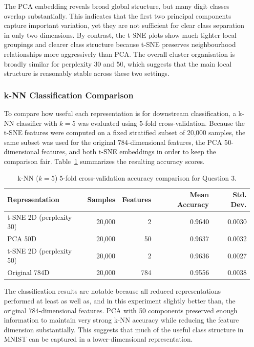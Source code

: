 \documentclass[11pt]{article}
\begin{document}
The PCA embedding reveals broad global structure, but many digit classes overlap substantially. This indicates that the first two principal components capture important variation, yet they are not sufficient for clear class separation in only two dimensions. By contrast, the t-SNE plots show much tighter local groupings and clearer class structure because t-SNE preserves neighbourhood relationships more aggressively than PCA. The overall cluster organisation is broadly similar for perplexity 30 and 50, which suggests that the main local structure is reasonably stable across these two settings.

\subsubsection{k-NN Classification Comparison}

To compare how useful each representation is for downstream classification, a k-NN classifier with \(k=5\) was evaluated using 5-fold cross-validation. Because the t-SNE features were computed on a fixed stratified subset of 20,000 samples, the same subset was used for the original 784-dimensional features, the PCA 50-dimensional features, and both t-SNE embeddings in order to keep the comparison fair. Table~\ref{tab:q3-knn-comparison} summarizes the resulting accuracy scores.

\begin{table}[ht]
    \centering
    \caption{k-NN (\(k=5\)) 5-fold cross-validation accuracy comparison for Question 3.}
    \label{tab:q3-knn-comparison}
    \begin{tabular}{lrrrr}
        \toprule
        Representation & Samples & Features & Mean Accuracy & Std. Dev. \\
        \midrule
        t-SNE 2D (perplexity 30) & 20,000 & 2 & 0.9640 & 0.0030 \\
        PCA 50D & 20,000 & 50 & 0.9637 & 0.0032 \\
        t-SNE 2D (perplexity 50) & 20,000 & 2 & 0.9636 & 0.0027 \\
        Original 784D & 20,000 & 784 & 0.9556 & 0.0038 \\
        \bottomrule
    \end{tabular}
\end{table}

The classification results are notable because all reduced representations performed at least as well as, and in this experiment slightly better than, the original 784-dimensional features. PCA with 50 components preserved enough information to maintain very strong k-NN accuracy while reducing the feature dimension substantially. This suggests that much of the useful class structure in MNIST can be captured in a lower-dimensional representation.
\end{document}
